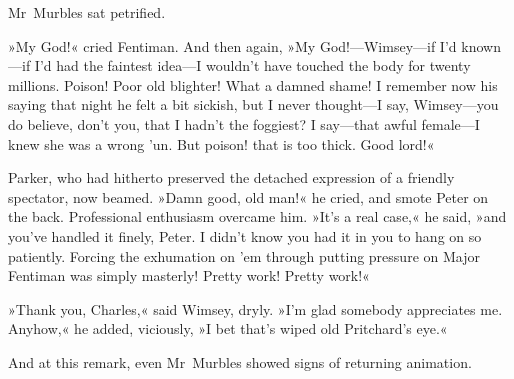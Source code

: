 
Mr~Murbles sat petrified.

»My God!« cried Fentiman. And then again, »My God!—Wimsey—if I'd known—if I'd had the faintest idea—I wouldn't have touched the body for twenty millions. Poison! Poor old blighter! What a damned shame! I remember now his saying that night he felt a bit sickish, but I never thought—I say, Wimsey—you do believe, don't you, that I hadn't the foggiest? I say—that awful female—I knew she was a wrong 'un. But poison! that is too thick. Good lord!«

Parker, who had hitherto preserved the detached expression of a friendly spectator, now beamed. »Damn good, old man!« he cried, and smote Peter on the back. Professional enthusiasm overcame him. »It's a real case,« he said, »and you've handled it finely, Peter. I didn't know you had it in you to hang on so patiently. Forcing the exhumation on 'em through putting pressure on Major Fentiman was simply masterly! Pretty work! Pretty work!«

»Thank you, Charles,« said Wimsey, dryly. »I'm glad somebody appreciates me. Anyhow,« he added, viciously, »I bet that's wiped old Pritchard's eye.«

And at this remark, even Mr~Murbles showed signs of returning animation.